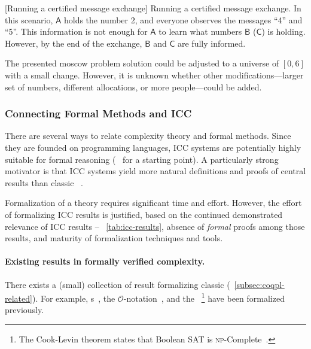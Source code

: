 \begin{center}
\captionsetup{type=lstlisting}
\begin{minipage}{\textwidth}
\end{minipage}
[Running a certified message exchange]{
   Running a certified message exchange. In this scenario, \(\mathsf{A}\) holds
   the number 2, and everyone observes the messages \enquote{4} and \enquote{5}.
   This information is not enough for \(\mathsf{A}\) to learn what numbers
   \(\mathsf{B}\) (\resp \(\mathsf{C}\)) is holding. However, by the end of the
   exchange, \(\mathsf{B}\) and \(\mathsf{C}\) are fully informed.
}\label{lst:run-exchange}
\end{center}

The presented moscow problem solution could be adjusted to a universe of \([0,
6]\) with a small change. However, it is unknown whether other
modifications---\eg larger set of numbers, different allocations, or more
people---could be added.

\subsubsection{Connecting Formal Methods and ICC}
\label{subsubsec:icc-formally}

There are several ways to relate complexity theory and formal methods. Since
they are founded on programming languages, ICC systems are potentially highly
suitable for formal reasoning (\cf~\textcite{cpierce20222} for a starting
point). A particularly strong motivator is that ICC systems yield more natural
definitions and proofs of central results than classic ~\cite{kristiansen2017}.

Formalization of a theory requires significant time and effort.
However, the effort of formalizing ICC results is justified, based on the
continued demonstrated relevance of ICC results -- \cf~\autoref{tab:icc-results},
absence of \emph{formal} proofs among those results, and
maturity of formalization techniques and tools.

\paragraph*{Existing results in formally verified complexity.}
There exists a (small) collection of result formalizing classic  (\cf~\autoref{subsec:coqpl-related}). For example, s~\cite{forster2020}, the
\(\mathcal{O}\)-notation~\cite{gueneau2018}, and the ~\cite{gaher2021}\footnote{The
Cook-Levin theorem states that Boolean SAT is
\textsc{np}-Complete~\cite{cook1971, levin1973}.} have been formalized
previously.

